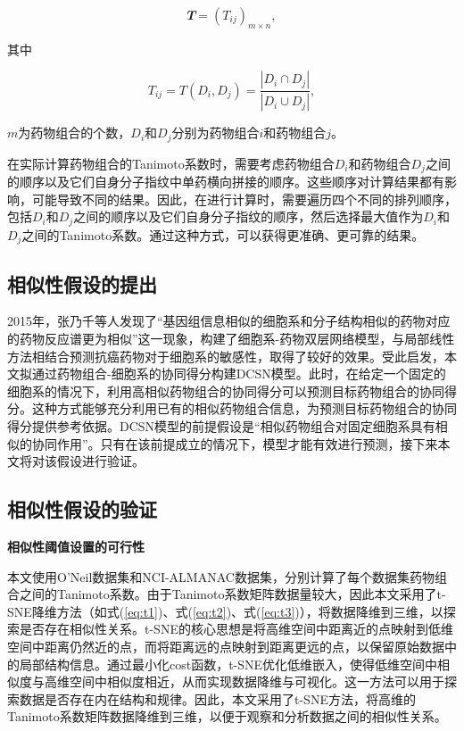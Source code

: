 \vspace{-1em}

\begin{equation}
\mathbfit{T} = (T_{ij})_{m\times n},\label{eq:dm}
\end{equation}

\noindent 其中

\begin{equation}
T_{ij} = T(D_i, D_j) = \frac{|D_i \cap D_j|}{|D_i \cup D_j|},\label{eq:T}
\end{equation}

\noindent $m$为药物组合的个数，$D_i$和$D_j$分别为药物组合$i$和药物组合$j$。

在实际计算药物组合的Tanimoto系数时，需要考虑药物组合$D_i$和药物组合$D_j$之间的顺序以及它们自身分子指纹中单药横向拼接的顺序。这些顺序对计算结果都有影响，可能导致不同的结果。因此，在进行计算时，需要遍历四个不同的排列顺序，包括$D_i$和$D_j$之间的顺序以及它们自身分子指纹的顺序，然后选择最大值作为$D_i$和$D_j$之间的Tanimoto系数。通过这种方式，可以获得更准确、更可靠的结果。

\subsection{相似性假设的提出}

2015年，张乃千等人发现了“基因组信息相似的细胞系和分子结构相似的药物对应的药物反应谱更为相似”这一现象，构建了细胞系-药物双层网络模型，与局部线性方法相结合预测抗癌药物对于细胞系的敏感性，取得了较好的效果\supercite{15}。受此启发，本文拟通过药物组合-细胞系的协同得分构建DCSN模型。此时，在给定一个固定的细胞系的情况下，利用高相似药物组合的协同得分可以预测目标药物组合的协同得分。这种方式能够充分利用已有的相似药物组合信息，为预测目标药物组合的协同得分提供参考依据。DCSN模型的前提假设是“相似药物组合对固定细胞系具有相似的协同作用”。只有在该前提成立的情况下，模型才能有效进行预测，接下来本文将对该假设进行验证。

\subsection{相似性假设的验证}

\textbf{相似性阈值设置的可行性}

本文使用O'Neil数据集和NCI-ALMANAC数据集，分别计算了每个数据集药物组合之间的Tanimoto系数。由于Tanimoto系数矩阵数据量较大，因此本文采用了t-SNE降维方法（如式(\ref{eq:t1})、式(\ref{eq:t2})、式(\ref{eq:t3})），将数据降维到三维，以探索是否存在相似性关系\supercite{29}。t-SNE的核心思想是将高维空间中距离近的点映射到低维空间中距离仍然近的点，而将距离远的点映射到距离更远的点，以保留原始数据中的局部结构信息。通过最小化cost函数，t-SNE优化低维嵌入，使得低维空间中相似度与高维空间中相似度相近，从而实现数据降维与可视化。这一方法可以用于探索数据是否存在内在结构和规律。因此，本文采用了t-SNE方法，将高维的Tanimoto系数矩阵数据降维到三维，以便于观察和分析数据之间的相似性关系。

